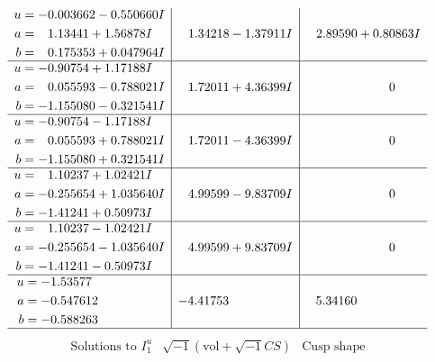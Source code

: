 \documentclass[1p]{elsarticle_modified}
\theoremstyle{definition}
\newcommand{\I}{\sqrt{-1}}
\begin{document}
$$\begin{array}{c|c|c}
\begin{aligned}
u &= -0.003662 - 0.550660 I \\
a &= \phantom{-}1.13441 + 1.56878 I \\
b &= \phantom{-}0.175353 + 0.047964 I\end{aligned}
 & \phantom{-}1.34218 - 1.37911 I & \phantom{-}2.89590 + 0.80863 I \\ \hline\begin{aligned}
u &= -0.90754 + 1.17188 I \\
a &= \phantom{-}0.055593 - 0.788021 I \\
b &= -1.155080 - 0.321541 I\end{aligned}
 & \phantom{-}1.72011 + 4.36399 I & \phantom{-0.000000 } 0 \\ \hline\begin{aligned}
u &= -0.90754 - 1.17188 I \\
a &= \phantom{-}0.055593 + 0.788021 I \\
b &= -1.155080 + 0.321541 I\end{aligned}
 & \phantom{-}1.72011 - 4.36399 I & \phantom{-0.000000 } 0 \\ \hline\begin{aligned}
u &= \phantom{-}1.10237 + 1.02421 I \\
a &= -0.255654 + 1.035640 I \\
b &= -1.41241 + 0.50973 I\end{aligned}
 & \phantom{-}4.99599 - 9.83709 I & \phantom{-0.000000 } 0 \\ \hline\begin{aligned}
u &= \phantom{-}1.10237 - 1.02421 I \\
a &= -0.255654 - 1.035640 I \\
b &= -1.41241 - 0.50973 I\end{aligned}
 & \phantom{-}4.99599 + 9.83709 I & \phantom{-0.000000 } 0 \\ \hline\begin{aligned}
u &= -1.53577\phantom{ +0.000000I} \\
a &= -0.547612\phantom{ +0.000000I} \\
b &= -0.588263\phantom{ +0.000000I}\end{aligned}
 & -4.41753\phantom{ +0.000000I} & \phantom{-}5.34160\phantom{ +0.000000I}\\
 \hline 
 \end{array}$$\newpage$$\begin{array}{c|c|c}  
\text{Solutions to }I^u_{1}& \I (\text{vol} + \sqrt{-1}CS) & \text{Cusp shape}\\

\end{array}$$
\end{document}
